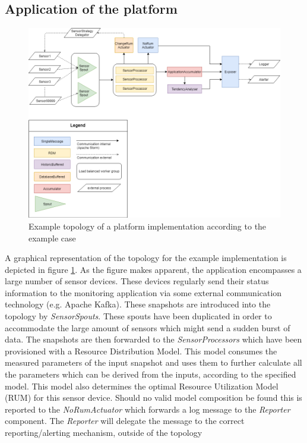 \subsection{Application of the platform}
\begin{figure}
\centering
\includegraphics[width=\textwidth]{resources/img/example_topology.png}
\caption{Example topology of a platform implementation according to the example case}
\label{fig:example_topology}
\end{figure}
A graphical representation of the topology for the example implementation is depicted in figure \ref{fig:example_topology}. As the figure makes apparent, the application encompasses a large number of sensor devices. These devices regularly send their status information to the monitoring application via some external communication technology (e.g. Apache Kafka). These snapshots are introduced into the topology by \emph{SensorSpouts}. These spouts have been duplicated in order to accommodate the large amount of sensors which might send a sudden burst of data. The snapshots are then forwarded to the \emph{SensorProcessors} which have been provisioned with a Resource Distribution Model. This model consumes the measured parameters of the input snapshot and uses them to further calculate all the parameters which can be derived from the inputs, according to the specified model. This model also determines the optimal Resource Utilization Model (RUM) for this sensor device. Should no valid model composition be found this is reported to the \emph{NoRumActuator} which forwards a log message to the \emph{Reporter} component. The \emph{Reporter} will delegate the message to the correct reporting/alerting mechanism, outside of the topology

